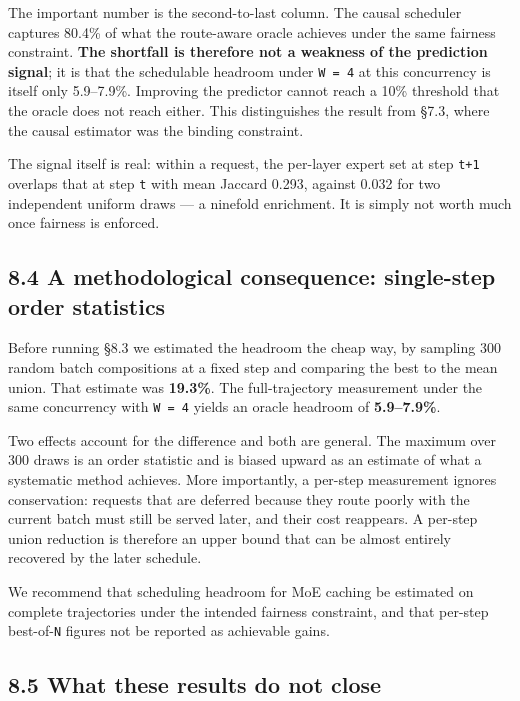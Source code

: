 \documentclass[
  10pt,
  letterpaper,
  10pt]{article}
\begin{document}
The important number is the second-to-last column. The causal scheduler
captures 80.4\% of what the route-aware oracle achieves under the same
fairness constraint. \textbf{The shortfall is therefore not a weakness
of the prediction signal}; it is that the schedulable headroom under
\texttt{W\ =\ 4} at this concurrency is itself only 5.9--7.9\%.
Improving the predictor cannot reach a 10\% threshold that the oracle
does not reach either. This distinguishes the result from §7.3, where
the causal estimator was the binding constraint.

The signal itself is real: within a request, the per-layer expert set at
step \texttt{t+1} overlaps that at step \texttt{t} with mean Jaccard
0.293, against 0.032 for two independent uniform draws --- a ninefold
enrichment. It is simply not worth much once fairness is enforced.

\subsection{8.4 A methodological consequence: single-step order
statistics}\label{a-methodological-consequence-single-step-order-statistics}

Before running §8.3 we estimated the headroom the cheap way, by sampling
300 random batch compositions at a fixed step and comparing the best to
the mean union. That estimate was \textbf{19.3\%}. The full-trajectory
measurement under the same concurrency with \texttt{W\ =\ 4} yields an
oracle headroom of \textbf{5.9--7.9\%}.

Two effects account for the difference and both are general. The maximum
over 300 draws is an order statistic and is biased upward as an estimate
of what a systematic method achieves. More importantly, a per-step
measurement ignores conservation: requests that are deferred because
they route poorly with the current batch must still be served later, and
their cost reappears. A per-step union reduction is therefore an upper
bound that can be almost entirely recovered by the later schedule.

We recommend that scheduling headroom for MoE caching be estimated on
complete trajectories under the intended fairness constraint, and that
per-step best-of-\texttt{N} figures not be reported as achievable gains.

\subsection{8.5 What these results do not
close}\label{what-these-results-do-not-close}
\end{document}
